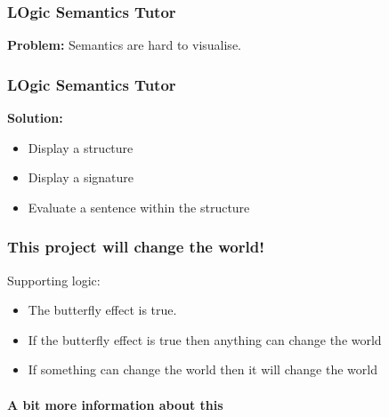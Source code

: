 \documentclass{beamer}
\begin{document}
\begin{frame}
\frametitle{LOgic Semantics Tutor}
\textbf{Problem:}
Semantics are hard to visualise.
\end{frame}

\begin{frame}
\frametitle{LOgic Semantics Tutor}
\textbf{Solution:}
\begin{itemize}
\item Display a structure
\item Display a signature
\item Evaluate a sentence within the structure
\end{itemize}
\end{frame}

\begin{frame}
\frametitle{This project will change the world!}
Supporting logic:
\begin{itemize}
\item The butterfly effect is true.
\item If the butterfly effect is true then anything can change the world
\item If something can change the world then it will change the world
\end{itemize}
\end{frame}


\begin{frame}
\framesubtitle{A bit more information about this}
\end{frame}

\end{document}
